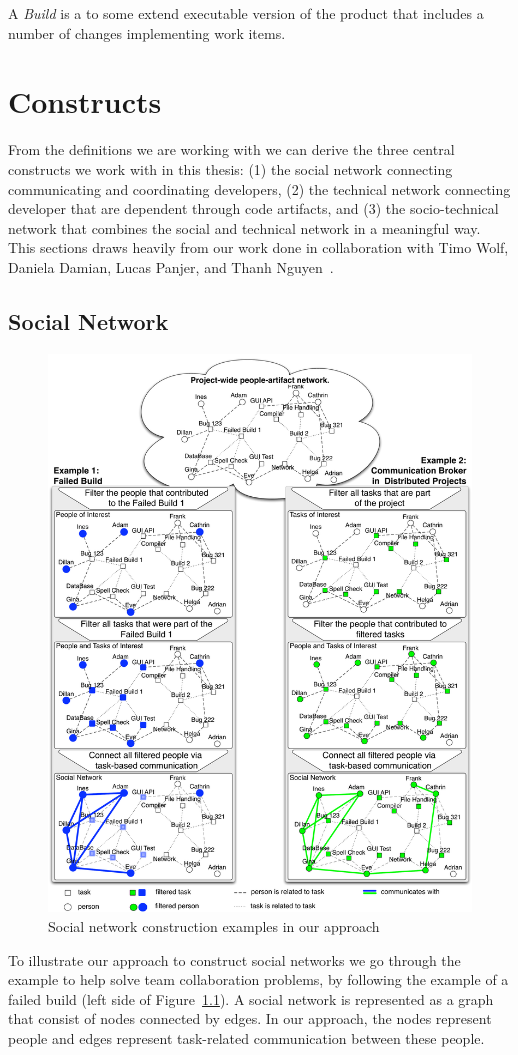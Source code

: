 \begin{note}
\begin{mydef}
A \emph{Build} is a to some extend executable version of the product that includes a number of changes implementing work items.
\end{mydef}
\end{note}

\section{Constructs}
From the definitions we are working with we can derive the three central constructs we work with in this thesis: (1) the social network connecting communicating and coordinating developers, (2) the technical network connecting developer that are dependent through code artifacts, and (3) the socio-technical network that combines the social and technical network in a meaningful way.
This sections draws heavily from our work done in collaboration with Timo Wolf, Daniela Damian, Lucas Panjer, and Thanh Nguyen~\cite{wolf:ieee:2009}.

\subsection{Social Network}
\begin{figure}[t!]
\begin{center}
\includegraphics[height=1\textwidth]{./figures/grand_figure}
\caption{Social network construction examples in our approach}
\label{fig:network}
\end{center}
\end{figure}
To illustrate our approach to construct social networks we go through the example to help solve team collaboration problems, by following the example of a failed build (left side of Figure~\ref{}). 
A social network is represented as a graph that consist of nodes connected by edges. 
In our approach, the nodes represent people and edges represent task-related communication between these people.

